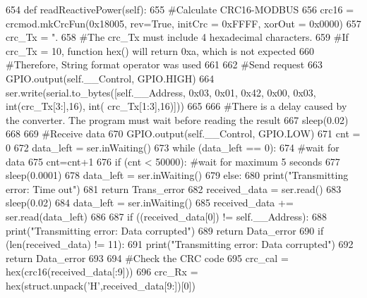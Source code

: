 \begin{DoxyCode}
654     \textcolor{keyword}{def }readReactivePower(self):
655         \textcolor{comment}{#Calculate CRC16-MODBUS
}
656         crc16 = crcmod.mkCrcFun(0x18005, rev=\textcolor{keyword}{True}, initCrc = 0xFFFF, xorOut = 0x0000)
657         crc\_Tx = \textcolor{stringliteral}{".%
658         \textcolor{comment}{#The crc\_Tx must include 4 hexadecimal characters.
}
659         \textcolor{comment}{#If crc\_Tx =  10, function hex() will return 0xa, which is not expected
}
660         \textcolor{comment}{#Therefore, String format operator was used
}
661     
662         \textcolor{comment}{#Send request
}
663         GPIO.output(self.\_\_Control, GPIO.HIGH)
664         ser.write(serial.to\_bytes([self.\_\_Address, 0x03, 0x01, 0x42, 0x00, 0x03, int(crc\_Tx[3:],16), int(
      crc\_Tx[1:3],16)]))
665     
666         \textcolor{comment}{#There is a delay caused by the converter. The program must wait before reading the result
}
667         sleep(0.02)
668     
669         \textcolor{comment}{#Receive data
}
670         GPIO.output(self.\_\_Control, GPIO.LOW)
671         cnt = 0
672         data\_left = ser.inWaiting()
673         \textcolor{keywordflow}{while} (data\_left == 0):
674             \textcolor{comment}{#wait for data
}
675             cnt=cnt+1
676             \textcolor{keywordflow}{if} (cnt < 50000): \textcolor{comment}{#wait for maximum 5 seconds
}
677                 sleep(0.0001)
678                 data\_left = ser.inWaiting()
679             \textcolor{keywordflow}{else}:
680                 print(\textcolor{stringliteral}{"Transmitting error: Time out"})
681                 \textcolor{keywordflow}{return} Trans\_error
682         received\_data = ser.read()
683         sleep(0.02)
684         data\_left = ser.inWaiting()
685         received\_data += ser.read(data\_left)
686         
687         \textcolor{keywordflow}{if} ((received\_data[0]) != self.\_\_Address):
688             print(\textcolor{stringliteral}{"Transmitting error: Data corrupted"})
689             \textcolor{keywordflow}{return} Data\_error
690         \textcolor{keywordflow}{if} (len(received\_data) != 11):
691             print(\textcolor{stringliteral}{"Transmitting error: Data corrupted"})
692             \textcolor{keywordflow}{return} Data\_error
693         
694         \textcolor{comment}{#Check the CRC code
}
695         crc\_cal = hex(crc16(received\_data[:9]))
696         crc\_Rx = hex(struct.unpack(\textcolor{stringliteral}{'H'},received\_data[9:])[0])
}
\end{DoxyCode}
